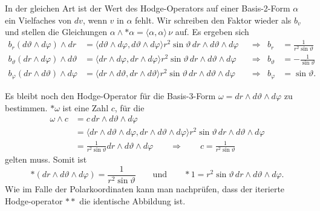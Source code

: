 \begin{enumerate}
In der gleichen Art ist der Wert des Hodge-Operators auf einer
Basis-2-Form $\alpha$ ein Vielfaches von $dv$, wenn $v$ in $\alpha$
fehlt.
Wir schreiben den Faktor wieder als $b_v$ und stellen die Gleichungen
$\alpha\wedge {\ast\alpha} = \langle \alpha,\alpha\rangle\,\nu$ auf.
Es ergeben sich 
\begin{align*}
b_r(d\vartheta\wedge d\varphi)\wedge dr
&=
\langle d\vartheta\wedge d\varphi,d\vartheta\wedge d\varphi\rangle
r^2\sin\vartheta\, dr\wedge d\vartheta\wedge d\varphi
&&\Rightarrow&
b_r &= \frac{1}{r^2\sin \vartheta}
\\
b_\vartheta(dr\wedge d\varphi)\wedge d\vartheta
&=
\langle dr \wedge d\varphi,dr \wedge d\varphi\rangle
r^2\sin\vartheta\, dr\wedge d\vartheta\wedge d\varphi
&&\Rightarrow&
b_\vartheta &= -\frac{1}{\sin \vartheta}
\\
b_\varphi(dr\wedge d\vartheta)\wedge d\varphi
&=
\langle dr \wedge d\vartheta,dr \wedge d\vartheta\rangle
r^2\sin\vartheta\, dr\wedge d\vartheta\wedge d\varphi
&&\Rightarrow&
b_\varphi &= \sin \vartheta.
\end{align*}

Es bleibt noch den Hodge-Operator für die Basis-3-Form
$\omega=dr\wedge d\vartheta\wedge d\varphi$ zu bestimmen.
$\ast\omega$ ist eine Zahl $c$, für die
\begin{align*}
\omega\wedge c
&=
c
\,dr\wedge d\vartheta\wedge d\varphi
\\
&=
\langle
dr\wedge d\vartheta\wedge d\varphi,
dr\wedge d\vartheta\wedge d\varphi
\rangle
r^2\sin\vartheta
\,
dr\wedge d\vartheta\wedge d\varphi
\\
&=
\frac{1}{r^2\sin\vartheta}
dr\wedge d\vartheta\wedge d\varphi
\qquad\Rightarrow\qquad
c=\frac{1}{r^2\sin\vartheta}
\end{align*}
gelten muss.
Somit ist
\[
\ast(dr \wedge d\vartheta \wedge d\varphi)
=
\frac{1}{r^2\sin\vartheta}
\qquad\text{und}\qquad
{\ast}1
=
r^2\sin\vartheta\, dr \wedge d\vartheta \wedge d\varphi.
\]
Wie im Falle der Polarkoordinaten kann man nachprüfen, dass der
iterierte Hodge-operator $\ast{\ast}$ die identische Abbildung ist.
\end{enumerate}


